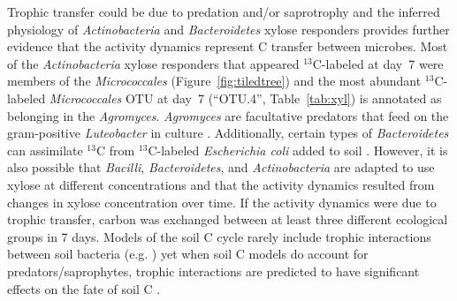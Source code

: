 Trophic transfer could be due to predation and/or saprotrophy and the inferred
physiology of \textit{Actinobacteria} and \textit{Bacteroidetes} xylose
responders provides further evidence that the activity dynamics represent 
C transfer between microbes. Most of the \textit{Actinobacteria} xylose
responders that appeared $^{13}$C-labeled at day~7 were members of the
\textit{Micrococcales} (Figure~\ref{fig:tiledtree}) and the most abundant
$^{13}$C-labeled \textit{Micrococcales} OTU at day~7 (“OTU.4”,
Table~\ref{tab:xyl}) is annotated as belonging in the \textit{Agromyces}.
\textit{Agromyces} are facultative predators that feed on the gram-positive
\textit{Luteobacter} in culture \citep{16346402}. Additionally, certain types
of \textit{Bacteroidetes} can assimilate $^{13}$C from $^{13}$C-labeled
\textit{Escherichia coli} added to soil \citep{Lueders2006}. However, it is
also possible that \textit{Bacilli}, \textit{Bacteroidetes}, and
\textit{Actinobacteria} are adapted to use xylose at different concentrations
and that the activity dynamics resulted from changes in xylose concentration
over time. If the activity dynamics were due to trophic transfer, carbon was
exchanged between at least three different ecological groups in 7 days. Models
of the soil C cycle rarely include trophic interactions between soil bacteria
(e.g. \citep{Moore1988}) yet when soil C models do account for
predators/saprophytes, trophic interactions are predicted to have significant
effects on the fate of soil C \citep{Kaiser2014a}. 

